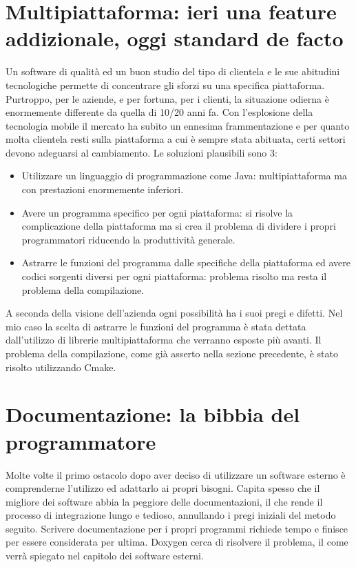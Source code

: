 \section{Multipiattaforma: ieri una feature addizionale, oggi standard de facto}
Un software di qualità ed un buon studio del tipo di clientela e le sue abitudini tecnologiche permette di concentrare gli sforzi su una specifica piattaforma. Purtroppo, per le aziende, e per fortuna, per i clienti, la situazione odierna è enormemente differente da quella di 10/20 anni fa. Con l'esplosione della tecnologia mobile il mercato ha subito un ennesima frammentazione e per quanto molta clientela resti sulla piattaforma a cui è sempre stata abituata, certi settori devono adeguarsi al cambiamento.
Le soluzioni plausibili sono 3:
\begin{itemize}
\item Utilizzare un linguaggio di programmazione come Java: multipiattaforma ma con prestazioni enormemente inferiori.
\item Avere un programma specifico per ogni piattaforma: si risolve la complicazione della piattaforma ma si crea il problema di dividere i propri programmatori riducendo la produttività generale.
\item Astrarre le funzioni del programma dalle specifiche della piattaforma ed avere codici sorgenti diversi per ogni piattaforma: problema risolto ma resta il problema della compilazione.
\end{itemize}
A seconda della visione dell'azienda ogni possibilità ha i suoi pregi e difetti. Nel mio caso la scelta di astrarre le funzioni del programma è stata dettata dall'utilizzo di librerie multipiattaforma che verranno esposte più avanti. Il problema della compilazione, come già asserto nella sezione precedente, è stato risolto utilizzando Cmake.
\section{Documentazione: la bibbia del programmatore}
Molte volte il primo ostacolo dopo aver deciso di utilizzare un software esterno è comprenderne l'utilizzo ed adattarlo ai propri bisogni. Capita spesso che il migliore dei software abbia la peggiore delle documentazioni, il che rende il processo di integrazione lungo e tedioso, annullando i pregi iniziali del metodo seguito.
Scrivere documentazione per i propri programmi richiede tempo e finisce per essere considerata per ultima. Doxygen cerca di risolvere il problema, il come verrà spiegato nel capitolo dei software esterni.